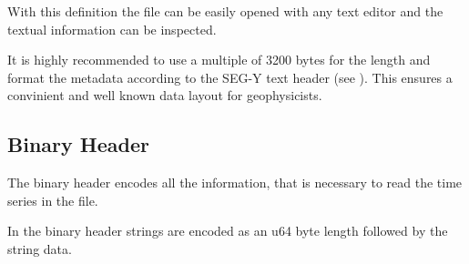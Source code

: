 \documentclass[DIV=10]{scrartcl}
\newcommand\litref[1]{\textref{[#1]}}
\begin{document}
With this definition the file can be easily opened with any text editor and the textual information can be inspected.

It is highly recommended to use a multiple of 3200 bytes for the length and format the metadata according to the SEG-Y text header (see \litref{Segy02}).
This ensures a convinient and well known data layout for geophysicists.


\subsection{Binary Header}

The binary header encodes all the information, that is necessary to read the time series in the file.

In the binary header strings are encoded as an u64 byte length followed by the string data.
\end{document}
